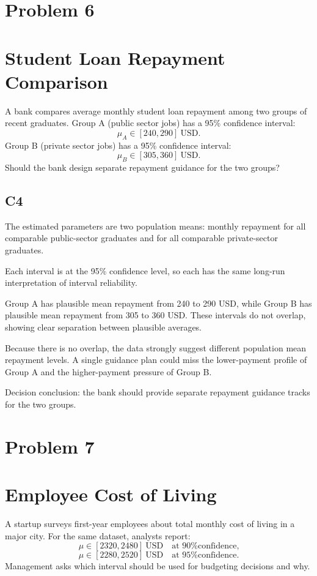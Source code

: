 \begin{ExamProblems}
		\newpage
		\item
		\section{Problem 6}
		\section{Student Loan Repayment Comparison}
		A bank compares average monthly student loan repayment among two groups of recent graduates.
		Group A (public sector jobs) has a 95\% confidence interval:
		\[
		\mu_A \in [240, 290]\ \text{USD}.
		\]
		Group B (private sector jobs) has a 95\% confidence interval:
		\[
		\mu_B \in [305, 360]\ \text{USD}.
		\]
		Should the bank design separate repayment guidance for the two groups?

		\subsection*{C4}
		The estimated parameters are two population means: monthly repayment for all comparable public-sector graduates and for all comparable private-sector graduates.

		Each interval is at the 95\% confidence level, so each has the same long-run interpretation of interval reliability.

		Group A has plausible mean repayment from 240 to 290 USD, while Group B has plausible mean repayment from 305 to 360 USD.
		These intervals do not overlap, showing clear separation between plausible averages.

		Because there is no overlap, the data strongly suggest different population mean repayment levels.
		A single guidance plan could miss the lower-payment profile of Group A and the higher-payment pressure of Group B.

		Decision conclusion: the bank should provide separate repayment guidance tracks for the two groups.

		\newpage
		\item
		\section{Problem 7}
		\section{Employee Cost of Living}
		A startup surveys first-year employees about total monthly cost of living in a major city.
		For the same dataset, analysts report:
		\[
		\mu \in [2320, 2480]\ \text{USD} \quad \text{at 90\% confidence,}
		\]
		\[
		\mu \in [2280, 2520]\ \text{USD} \quad \text{at 95\% confidence.}
		\]
		Management asks which interval should be used for budgeting decisions and why.


\end{ExamProblems}
